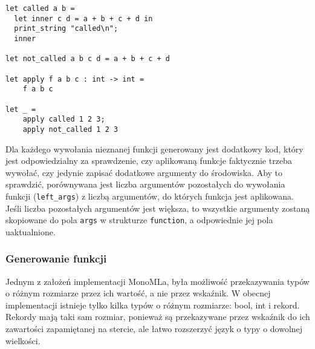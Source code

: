 \documentclass[declaration,shortabstract]{iithesis}
\begin{document}
\begin{lstlisting}[frame=lines]
let called a b = 
  let inner c d = a + b + c + d in 
  print_string "called\n";
  inner 

let not_called a b c d = a + b + c + d 

let apply f a b c : int -> int = 
    f a b c 

let _ = 
    apply called 1 2 3;
    apply not_called 1 2 3
\end{lstlisting}

Dla każdego wywołania nieznanej funkcji generowany jest dodatkowy
kod, który jest odpowiedzialny za sprawdzenie, czy aplikowaną funkcje 
faktycznie trzeba wywołać, czy jedynie zapisać dodatkowe argumenty do 
środowiska. Aby to sprawdzić, porównywana jest liczba argumentów pozostałych do 
wywołania funkcji (\texttt{left\_args}) z liczbą argumentów, do których 
funkcja jest aplikowana.
Jeśli liczba pozostałych argumentów jest większa, to wszystkie argumenty 
zostaną skopiowane do pola \texttt{args} w strukturze \texttt{function}, a 
odpowiednie jej pola uaktualnione.










\subsubsection{Generowanie funkcji}

Jednym z założeń implementacji MonoMLa, była możliwość przekazywania typów
o różnym rozmiarze przez ich wartość, a nie przez wskaźnik. W obecnej 
implementacji istnieje tylko kilka typów o różnym rozmiarze: bool,
int i rekord. Rekordy mają taki sam rozmiar, ponieważ są 
przekazywane przez wskaźnik do ich zawartości zapamiętanej na stercie, ale 
łatwo rozszerzyć język o typy o dowolnej wielkości. 
\end{document}
